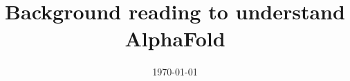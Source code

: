 \documentclass[letterpaper,11pt,reqno]{amsart}
\begin{document}
\title{Background reading to understand AlphaFold}
\date{\today}
\maketitle

\nocite{*}


\end{document}

